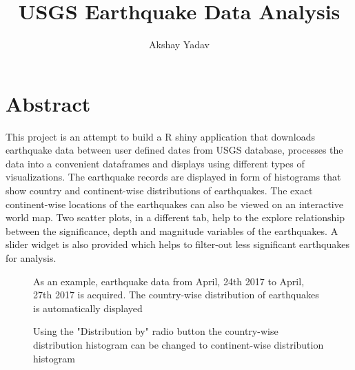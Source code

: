 \documentclass{article}
\date{}
\title{USGS Earthquake Data Analysis}
\author{Akshay Yadav}
\begin{document}
	\maketitle
	\section{Abstract}
		This project is an attempt to build a R shiny application that downloads earthquake data between user defined dates from USGS database, processes the data into a convenient dataframes and displays using different types of visualizations. The earthquake records are displayed in form of histograms that show country and continent-wise distributions of earthquakes. The exact continent-wise locations of the earthquakes can also be viewed on an interactive world map. Two scatter plots, in a different tab, help to the explore relationship between the significance, depth and magnitude variables of the earthquakes. A slider widget is also provided which helps to filter-out less significant earthquakes for analysis. 
		
		\begin{figure}
			\caption{As an example, earthquake data from April, 24th 2017 to April, 27th 2017 is acquired. The country-wise distribution of earthquakes is automatically displayed}
		\end{figure}
		
		\begin{figure}
			\caption{Using the "Distribution by" radio button the country-wise distribution histogram can be changed to continent-wise distribution histogram}
		\end{figure}
		
\end{document}
